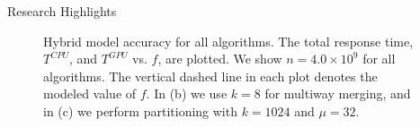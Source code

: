 \documentclass[final]{beamer}
\newlength{\colwidth}
\begin{document}
\begin{frame}[t]
\begin{columns}[t]
\begin{column}{\colwidth}
\begin{block}{Research Highlights}
\begin{figure}[htp]
\centering
{}
 \caption{Hybrid model accuracy for all algorithms. The total response time, $T^{CPU}$, and $T^{GPU}$ vs. $f$, are plotted. We show $n=4.0\times10^9$ for all algorithms. The vertical dashed line in each plot denotes the modeled value of $f$. In (b) we use $k=8$ for multiway merging, and in (c) we perform partitioning with $k=1024$ and $\mu=32$.}

   \label{fig:time_vs_f}
\end{figure}



\end{block}
\end{column}
\end{columns}
\end{frame}
\end{document}
